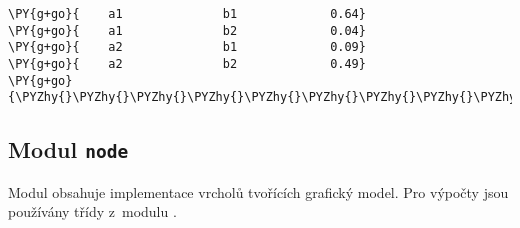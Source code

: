 \begin{fulllineitems}
\begin{Verbatim}[commandchars=\\\{\}]
\PY{g+go}{    a1              b1             0.64}
\PY{g+go}{    a1              b2             0.04}
\PY{g+go}{    a2              b1             0.09}
\PY{g+go}{    a2              b2             0.49}
\PY{g+go}{\PYZhy{}\PYZhy{}\PYZhy{}\PYZhy{}\PYZhy{}\PYZhy{}\PYZhy{}\PYZhy{}\PYZhy{}\PYZhy{}\PYZhy{}\PYZhy{}\PYZhy{}\PYZhy{}\PYZhy{}\PYZhy{}\PYZhy{}\PYZhy{}\PYZhy{}\PYZhy{}\PYZhy{}\PYZhy{}\PYZhy{}\PYZhy{}\PYZhy{}\PYZhy{}\PYZhy{}\PYZhy{}\PYZhy{}\PYZhy{}\PYZhy{}\PYZhy{}\PYZhy{}\PYZhy{}\PYZhy{}\PYZhy{}\PYZhy{}\PYZhy{}\PYZhy{}\PYZhy{}\PYZhy{}\PYZhy{}\PYZhy{}\PYZhy{}\PYZhy{}\PYZhy{}\PYZhy{}\PYZhy{}\PYZhy{}\PYZhy{}}
\end{Verbatim}

\end{fulllineitems}



\subsection{Modul \texttt{node}}
\label{alex.infer:modul-node}
Modul obsahuje implementace vrcholů tvořících grafický model.
Pro výpočty jsou používány třídy z~modulu {\hyperref[alex.infer:module-alex.infer.factor]{}}.

